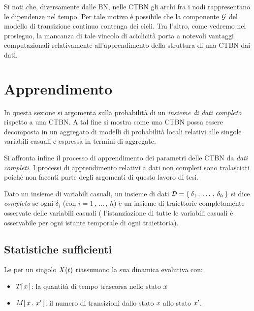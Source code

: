 Si noti che, diversamente dalle \acl{BN}, nelle \acl{CTBN} gli archi fra i nodi rappresentano le dipendenze nel tempo. Per tale motivo è possibile che la componente $\mathcal{G}$ del modello di transizione continuo contenga dei cicli. Tra l'altro, come vedremo nel prosieguo, la mancanza di tale vincolo di aciclicità porta a notevoli vantaggi computazionali relativamente all'apprendimento della struttura di una \acs{CTBN} dai dati.

\section{Apprendimento}
\label{sec:ctbn-apprendimento}
In questa sezione si argomenta sulla probabilità di un \emph{insieme di dati completo} rispetto a una \acl{CTBN}. A tal fine si mostra come una \acs{CTBN} possa essere decomposta in un aggregato di modelli di probabilità locali relativi alle singole variabili casuali e espressa in termini di \emph{\keyword{\stats{}}} aggregate.

Si affronta infine il processo di apprendimento dei parametri delle \acl{CTBN} da \emph{dati completi}. I processi di apprendimento relativi a dati non completi sono tralasciati poiché non facenti parte degli argomenti di questo lavoro di tesi.

\begin{definizione}
\label{defn:dataset-completo}
Dato un insieme di variabili casuali, un insieme di dati $\mathcal{D}=\{\,\delta_1\,,\,\dotsc\,,\,\delta_h\,\}$ si dice \emph{completo} se ogni $\delta_i$ (con $i=1\,,\,\dotsc\,,\,h$) è un insieme di traiettorie completamente osservate delle variabili casuali (\ie{} l'istanziazione di tutte le variabili casuali è osservabile per ogni istante temporale di ogni traiettoria).
\end{definizione}

\subsection{Statistiche sufficienti}
\label{subsec:ctbn-sufficient-stats}
Le \emph{\keyword{\stats{}}} per un singolo \mprocess*{} \omog*{} $\mathnormal{X}(t)$ riassumono la sua dinamica evolutiva con:
\begin{itemize}
    \item $T[\,\mathnormal{x}\,]$: la quantità di tempo trascorsa nello stato $\mathnormal{x}$
    \item $\mstat[x]{\setel{x}^\prime}$: il numero di transizioni dallo stato $\mathnormal{x}$ allo stato $\mathnormal{x}^\prime$.
\end{itemize}

